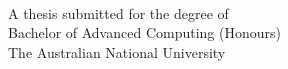 \begin{titlepage}
  \enlargethispage{2cm}
  \begin{center}
    \makeatletter
    \Huge\textbf{\@title} \\[.4cm]
    \Huge\textbf{\thesisqualifier} \\[2.5cm]
    \huge\textbf{\@author} \\[9cm]
    \makeatother
    \LARGE A thesis submitted for the degree of \\
    Bachelor of Advanced Computing (Honours) \\
    The Australian National University \\[2cm]
    \thismonth
  \end{center}
\end{titlepage}
